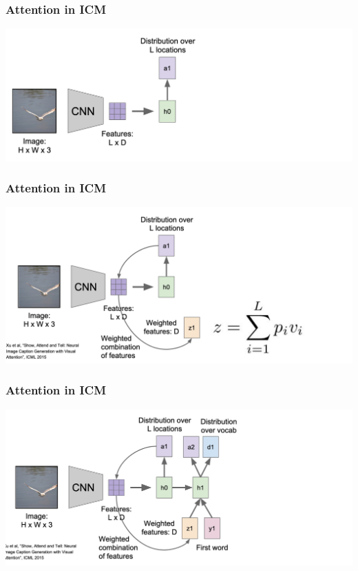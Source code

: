 \documentclass[aspectratio=1610]{beamer} %
\begin{document}
\begin{frame}
\frametitle{Attention in ICM}
\begin{center}
\includegraphics[width=1\textwidth]{pics/att3}
\end{center}
\end{frame}

\begin{frame}
\frametitle{Attention in ICM}
\begin{center}
\includegraphics[width=1\textwidth]{pics/att4}
\end{center}
\end{frame}

\begin{frame}
\frametitle{Attention in ICM}
\begin{center}
\includegraphics[width=1\textwidth]{pics/att5}
\end{center}
\end{frame}
\end{document}
